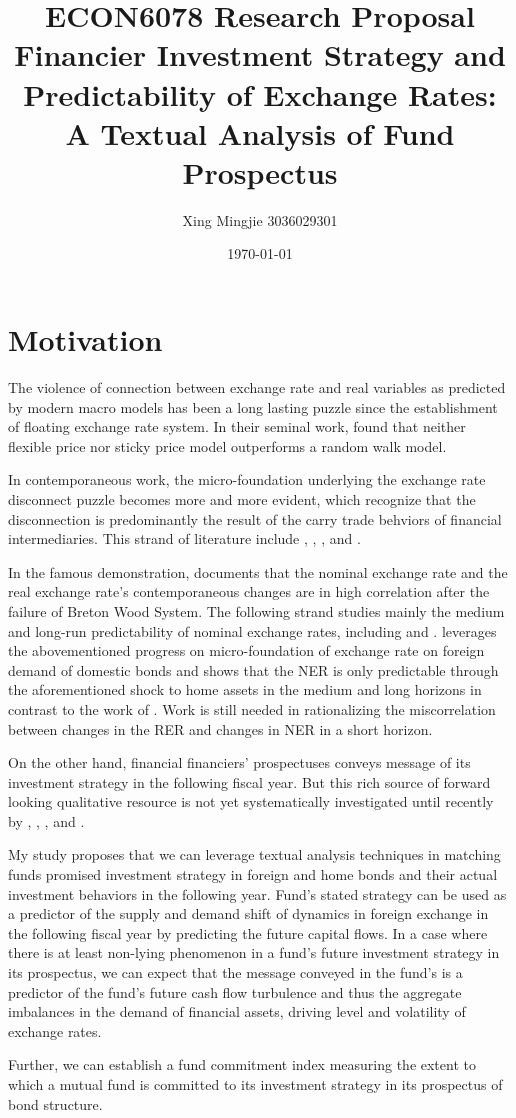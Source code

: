 \documentclass[12pt]{article} %
\title{ECON6078 Research Proposal\\ Financier Investment Strategy and Predictability of Exchange Rates:\\ A Textual Analysis of Fund Prospectus}
\author{Xing Mingjie 3036029301}
\date{\today} %
\begin{document}
\maketitle
\section{Motivation}
	The violence of connection between exchange rate and real variables as predicted by modern macro models has been a long lasting puzzle since the establishment of floating exchange rate system. In their seminal work, \cite{MeeseRogoff1983} found that neither flexible price nor sticky price model outperforms a random walk model.\par
	In contemporaneous work, the micro-foundation underlying the exchange rate disconnect puzzle becomes more and more evident, which recognize that the disconnection is predominantly the result of the carry trade behviors of financial intermediaries. This strand of literature include \cite{GabaixMaggiori2015}, \cite{ItshkohiMukhin2021}, \cite{Jiangetal2021}, and \cite{EichenbaumJohannsenRebelo2021}.\par
	In the famous demonstration, \cite{Mussa1986} documents that the nominal exchange rate and the real exchange rate's contemporaneous changes are in high correlation after the failure of Breton Wood System. The following strand studies mainly the medium and long-run predictability of nominal exchange rates, including \cite{Mark1995} and \cite{Engeletal2007}. \cite{EichenbaumJohannsenRebelo2021} leverages the abovementioned progress on micro-foundation of exchange rate on foreign demand of domestic bonds and shows that the NER is only predictable through the aforementioned shock to home assets in the medium and long horizons in contrast to the work of \cite{Mussa1986}. Work is still needed in rationalizing the miscorrelation between changes in the RER and changes in NER in a short horizon.\par
	On the other hand, financial financiers' prospectuses conveys message of its investment strategy in the following fiscal year. But this rich source of forward looking qualitative resource is not yet systematically investigated until recently by \cite{KostovetskyWarner2020}, \cite{KrakowSchaefer2020}, \cite{AbisLines2022}, and \cite{ShengXuZheng2022}.\par
	My study proposes that we can leverage textual analysis techniques in matching funds promised investment strategy in foreign and home bonds and their actual investment behaviors in the following year. Fund's stated strategy can be used as a predictor of the supply and demand shift of dynamics in foreign exchange in the following fiscal year by predicting the future capital flows. In a case where there is at least non-lying phenomenon in a fund's future investment strategy in its prospectus, we can expect that the message conveyed in the fund's is a predictor of the fund's future cash flow turbulence and thus the aggregate imbalances in the demand of financial assets, driving level and volatility of exchange rates.\par
	Further, we can establish a fund commitment index measuring the extent to which a mutual fund is committed to its investment strategy in its prospectus of bond structure.
	
\end{document}
